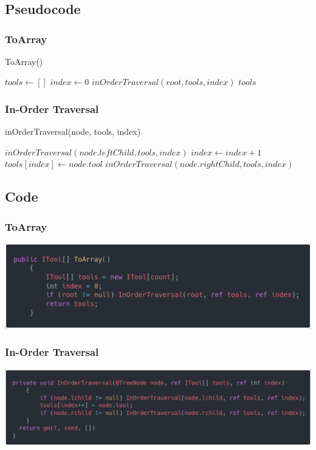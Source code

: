 \documentclass[10pt,a4paper]{report}
\begin{document}
\appendix
\chapter{}
\section{Pseudocode}
\subsection{ToArray}
\begin{algorithm}[H]
\caption{ToArray()}
\begin{algorithmic}[1]
	\State $tools \gets []$
	\State $index \gets 0$
		\State $inOrderTraversal(root, tools, index)$
	\EndIf
	\State \Return  $tools$
\end{algorithmic}
\end{algorithm}

\subsection{In-Order Traversal}
\begin{algorithm}[H]
\caption{inOrderTraversal(node, tools, index)}
\begin{algorithmic}[1]
		\State $inOrderTraversal(node.leftChild, tools, index)$
	\EndIf
	\State $index \gets index + 1$
	\State $ tools[index] \gets node.tool $
		\State $inOrderTraversal(node.rightChild, tools, index)$
	\EndIf
\end{algorithmic}
\end{algorithm}

\section{Code}
\subsection{ToArray}
\includegraphics[width=\textwidth]{ToArray.png} 
\subsection{In-Order Traversal}
\includegraphics[width=\textwidth]{IOT.png} 
\end{document}
